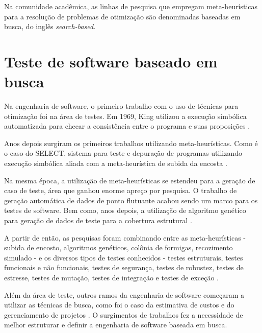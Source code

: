 Na comunidade acadêmica, as linhas de pesquisa que empregam meta-heurísticas
para a resolução de problemas de otimização são denominadas baseadas em busca,
do inglês \textit{search-based}.

\section{Teste de software baseado em busca}

Na engenharia de software, o primeiro trabalho com o uso de técnicas para
otimização foi na área de testes. Em 1969, King utilizou a execução simbólica
automatizada para checar a consistência entre o programa e suas proposições
\cite{king1969program}. 

Anos depois surgiram os primeiros trabalhos utilizando meta-heurísticas. Como é
o caso do SELECT, sistema para teste e depuração de programas utilizando
execução simbólica aliada com a meta-heurística de subida da encosta
\cite{boyer1975select}.


Na mesma época, a utilização de meta-heurísticas se estendeu para a geração de
caso de teste, área que ganhou enorme apreço por pesquisa. O trabalho de geração
automática de dados de ponto flutuante \cite{miller1976automatic} acabou sendo
um marco para os testes de software. Bem como, anos depois, a utilização de
algoritmo genético para geração de dados de teste para a cobertura estrutural
\cite{xanthakis1992application}.

A partir de então, as pesquisas foram combinando entre as meta-heurísticas -
subida de encosto, algoritmos genéticos, colônia de formigas, recozimento
simulado - e os diversos tipos de testes  conhecidos - testes estruturais,
testes funcionais e não funcionais, testes de segurança, testes de robustez,
testes de estresse, testes de mutação, testes de integração e testes de exceção
\cite{harman2009search}.

Além da área de teste, outros ramos da engenharia de software começaram a
utilizar as técnicas de busca, como foi o caso da estimativa de custos e do
gerenciamento de projetos \cite{de2011ten}. O surgimentos de trabalhos fez a
necessidade de melhor estruturar e definir a engenharia de software baseada em
busca.

